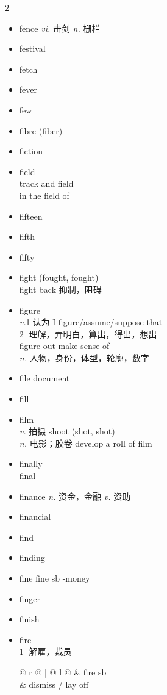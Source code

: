 \documentclass[../../book.tex]{subfiles}
\begin{document}
\begin{multicols}{2}
\begin{itemize}
\item[-] fence \emph{vi.} 击剑 \emph{n.} 栅栏
\item[-] festival
\item[-] fetch
\item[-] fever
\item[-] few
\item[-] fibre (fiber)
\item[-] fiction
\item[-] field
\\track and field
\\in the field of
\item[-] fifteen
\item[-] fifth
\item[-] fifty
\item[-] fight (fought, fought)
\\fight back 抑制，阻碍
\item[-] figure
\\\emph{v.}\textcircled{1}{\small 认为 I figure/assume/suppose that}
\\\textcircled{2} 理解，弄明白，算出，得出，想出
\\\phantom{aa} figure out \phantom{a} make sense of
\\\emph{n.} 人物，身份，体型，轮廓，数字
\item[-] file \phantom{a} document
\item[-] fill
\item[-] film
\\\emph{v.} 拍摄 shoot (shot, shot)
\\\emph{n.} 电影；胶卷 develop a roll of film
\item[-] finally
\\final
\item[-] finance \emph{n.} 资金，金融 \emph{v.} 资助
\item[-] financial
\item[-] find
\item[-] finding
\item[-] fine \phantom{a} fine sb -money
\item[-] finger
\item[-] finish
\item[-] fire
\\\textcircled{1} 解雇，裁员 \begin{tabular}{@{} r @{} | @{\hspace{0.1em}} l @{}}
 & fire sb
\\& dismiss / lay off
\end{tabular}

\end{itemize}
\end{multicols}
\end{document}
